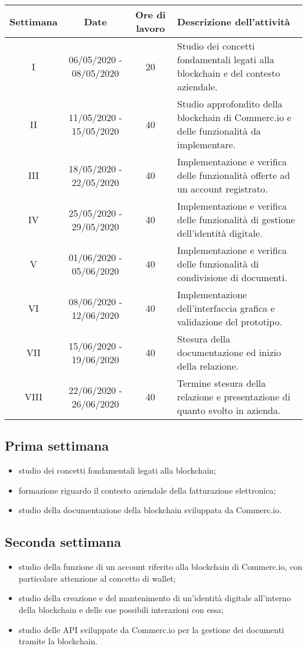 \begin{tabularx}{\textwidth}{|c|c|c|p{7.85cm}|}
	\hline
	\textbf{Settimana} & \textbf{Date} & \textbf{Ore di lavoro} & \textbf{Descrizione dell'attività} \\\hline
	I & 06/05/2020 - 08/05/2020 & 20 & Studio dei concetti fondamentali legati alla blockchain e del contesto aziendale. \\\hline
	II & 11/05/2020 - 15/05/2020 & 40 & Studio approfondito della blockchain di Commerc.io e delle funzionalità da implementare. \\\hline
	III & 18/05/2020 - 22/05/2020 & 40 & Implementazione e verifica delle funzionalità offerte ad un account registrato. \\\hline
	IV & 25/05/2020 - 29/05/2020 & 40 & Implementazione e verifica delle funzionalità di gestione dell'identità digitale. \\\hline
	V & 01/06/2020 - 05/06/2020 & 40 & Implementazione e verifica delle funzionalità di condivisione di documenti. \\\hline
	VI & 08/06/2020 - 12/06/2020 & 40 & Implementazione dell'interfaccia grafica e validazione del prototipo. \\\hline
	VII & 15/06/2020 - 19/06/2020 & 40 & Stesura della documentazione ed inizio della relazione. \\\hline
	VIII & 22/06/2020 - 26/06/2020 & 40 & Termine stesura della relazione e presentazione di quanto svolto in azienda. \\\hline
\end{tabularx}

\subsection*{Prima settimana}
\begin{itemize}
	\item studio dei concetti fondamentali legati alla blockchain;
	\item formazione riguardo il contesto aziendale della fatturazione elettronica;
	\item studio della documentazione della blockchain sviluppata da Commerc.io.
\end{itemize}

\subsection*{Seconda settimana} 
\begin{itemize}
	\item studio della funzione di un account riferito alla blockchain di Commerc.io, con particolare attenzione al concetto di wallet;
	\item studio della creazione e del mantenimento di un'identità digitale all'interno della blockchain e delle sue possibili interazioni con essa;
	\item studio delle API sviluppate da Commerc.io per la gestione dei documenti tramite la blockchain.
\end{itemize}

